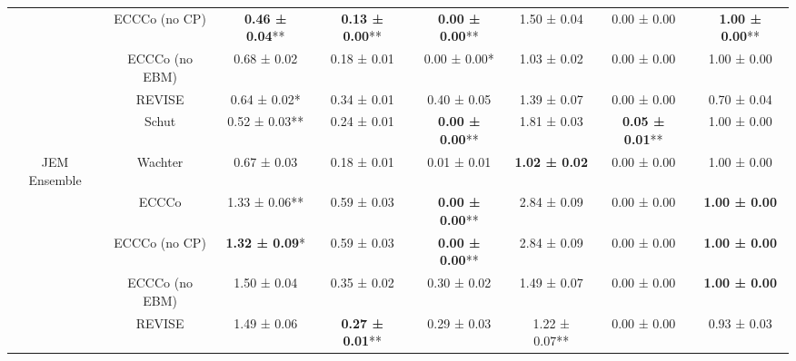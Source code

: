 \begin{table}
{\begin{tabular}[t]{cccccccc}
 & ECCCo (no CP) & \textbf{0.46 ± 0.04}** & \textbf{0.13 ± 0.00}** & \textbf{0.00 ± 0.00}** & 1.50 ± 0.04\hphantom{*}\hphantom{*} & 0.00 ± 0.00\hphantom{*}\hphantom{*} & \textbf{1.00 ± 0.00}**\\

 & ECCCo (no EBM) & 0.68 ± 0.02\hphantom{*}\hphantom{*} & 0.18 ± 0.01\hphantom{*}\hphantom{*} & 0.00 ± 0.00*\hphantom{*} & 1.03 ± 0.02\hphantom{*}\hphantom{*} & 0.00 ± 0.00\hphantom{*}\hphantom{*} & 1.00 ± 0.00\hphantom{*}\hphantom{*}\\

 & REVISE & 0.64 ± 0.02*\hphantom{*} & 0.34 ± 0.01\hphantom{*}\hphantom{*} & 0.40 ± 0.05\hphantom{*}\hphantom{*} & 1.39 ± 0.07\hphantom{*}\hphantom{*} & 0.00 ± 0.00\hphantom{*}\hphantom{*} & 0.70 ± 0.04\hphantom{*}\hphantom{*}\\

 & Schut & 0.52 ± 0.03** & 0.24 ± 0.01\hphantom{*}\hphantom{*} & \textbf{0.00 ± 0.00}** & 1.81 ± 0.03\hphantom{*}\hphantom{*} & \textbf{0.05 ± 0.01}** & 1.00 ± 0.00\hphantom{*}\hphantom{*}\\

\multirow[t]{-6}{*}{\centering\arraybackslash JEM Ensemble} & Wachter & 0.67 ± 0.03\hphantom{*}\hphantom{*} & 0.18 ± 0.01\hphantom{*}\hphantom{*} & 0.01 ± 0.01\hphantom{*}\hphantom{*} & \textbf{1.02 ± 0.02}\hphantom{*}\hphantom{*} & 0.00 ± 0.00\hphantom{*}\hphantom{*} & 1.00 ± 0.00\hphantom{*}\hphantom{*}\\
\cmidrule{1-8}
 & ECCCo & 1.33 ± 0.06** & 0.59 ± 0.03\hphantom{*}\hphantom{*} & \textbf{0.00 ± 0.00}** & 2.84 ± 0.09\hphantom{*}\hphantom{*} & 0.00 ± 0.00\hphantom{*}\hphantom{*} & \textbf{1.00 ± 0.00}\hphantom{*}\hphantom{*}\\

 & ECCCo (no CP) & \textbf{1.32 ± 0.09}*\hphantom{*} & 0.59 ± 0.03\hphantom{*}\hphantom{*} & \textbf{0.00 ± 0.00}** & 2.84 ± 0.09\hphantom{*}\hphantom{*} & 0.00 ± 0.00\hphantom{*}\hphantom{*} & \textbf{1.00 ± 0.00}\hphantom{*}\hphantom{*}\\

 & ECCCo (no EBM) & 1.50 ± 0.04\hphantom{*}\hphantom{*} & 0.35 ± 0.02\hphantom{*}\hphantom{*} & 0.30 ± 0.02\hphantom{*}\hphantom{*} & 1.49 ± 0.07\hphantom{*}\hphantom{*} & 0.00 ± 0.00\hphantom{*}\hphantom{*} & \textbf{1.00 ± 0.00}\hphantom{*}\hphantom{*}\\

 & REVISE & 1.49 ± 0.06\hphantom{*}\hphantom{*} & \textbf{0.27 ± 0.01}** & 0.29 ± 0.03\hphantom{*}\hphantom{*} & 1.22 ± 0.07** & 0.00 ± 0.00\hphantom{*}\hphantom{*} & 0.93 ± 0.03\hphantom{*}\hphantom{*}\\


\end{tabular}}
\end{table}
